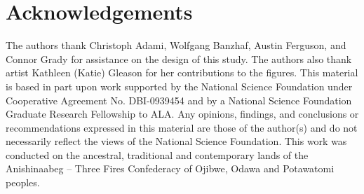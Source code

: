 \section{Acknowledgements}

The authors thank Christoph Adami, Wolfgang Banzhaf, Austin Ferguson, and Connor Grady for assistance on the design of this study. The authors also thank artist Kathleen (Katie) Gleason for her contributions to the figures.
This material is based in part upon work supported by the National Science Foundation under Cooperative Agreement No. DBI-0939454 
and by a National Science Foundation Graduate Research Fellowship to ALA. 
Any opinions, findings, and conclusions or recommendations expressed in this material are those of the author(s) and do not necessarily reflect the views of the National Science Foundation.
This work was conducted on the ancestral, traditional and contemporary lands of the Anishinaabeg – Three Fires Confederacy of Ojibwe, Odawa and Potawatomi peoples.